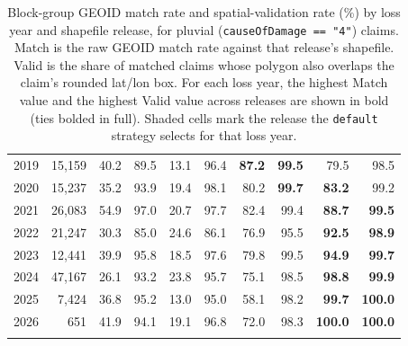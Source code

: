 {\begin{longtable}{rrrrrrrrrr}
2019 & 15,159 & 40.2 & 89.5 & 13.1 & 96.4 & \cellcolor{gray!15}\textbf{87.2} & \cellcolor{gray!15}\textbf{99.5} & 79.5 & 98.5 \\
2020 & 15,237 & 35.2 & 93.9 & 19.4 & 98.1 & 80.2 & \textbf{99.7} & \cellcolor{gray!15}\textbf{83.2} & \cellcolor{gray!15}99.2 \\
2021 & 26,083 & 54.9 & 97.0 & 20.7 & 97.7 & 82.4 & 99.4 & \cellcolor{gray!15}\textbf{88.7} & \cellcolor{gray!15}\textbf{99.5} \\
2022 & 21,247 & 30.3 & 85.0 & 24.6 & 86.1 & 76.9 & 95.5 & \cellcolor{gray!15}\textbf{92.5} & \cellcolor{gray!15}\textbf{98.9} \\
2023 & 12,441 & 39.9 & 95.8 & 18.5 & 97.6 & 79.8 & 99.5 & \cellcolor{gray!15}\textbf{94.9} & \cellcolor{gray!15}\textbf{99.7} \\
2024 & 47,167 & 26.1 & 93.2 & 23.8 & 95.7 & 75.1 & 98.5 & \cellcolor{gray!15}\textbf{98.8} & \cellcolor{gray!15}\textbf{99.9} \\
2025 & 7,424 & 36.8 & 95.2 & 13.0 & 95.0 & 58.1 & 98.2 & \cellcolor{gray!15}\textbf{99.7} & \cellcolor{gray!15}\textbf{100.0} \\
2026 & 651 & 41.9 & 94.1 & 19.1 & 96.8 & 72.0 & 98.3 & \cellcolor{gray!15}\textbf{100.0} & \cellcolor{gray!15}\textbf{100.0} \\
\bottomrule
\caption{Block-group GEOID match rate and spatial-validation rate (\%) by loss year and shapefile release, for pluvial (\texttt{causeOfDamage == "4"}) claims. Match is the raw GEOID match rate against that release's shapefile. Valid is the share of matched claims whose polygon also overlaps the claim's rounded lat/lon box. For each loss year, the highest Match value and the highest Valid value across releases are shown in bold (ties bolded in full). Shaded cells mark the release the \texttt{default} strategy selects for that loss year.}
\label{tab:release-match-rate-bg}\\
\end{longtable}
}
